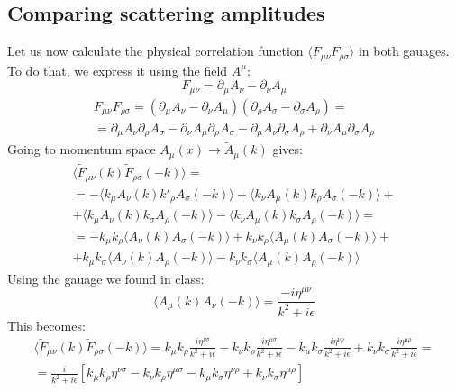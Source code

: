 \documentclass{article}
\begin{document}
\subsection{Comparing scattering amplitudes}
Let us now calculate the physical correlation function $\langle F_{\mu\nu} F_{\rho\sigma} \rangle$ in both gauages. To do that, we express it using the field $A^{\mu}$:
\begin{equation}
    F_{\mu\nu} = \partial_\mu A_\nu - \partial_\nu A_\mu
\end{equation}
\begin{equation}
\begin{gathered}
    F_{\mu\nu} F_{\rho\sigma} =
    \left(\partial_\mu A_\nu - \partial_\nu A_\mu\right)
    \left(\partial_\rho A_\sigma - \partial_\sigma A_\rho\right) = \\ =
    \partial_\mu A_\nu \partial_\rho A_\sigma - \partial_\nu A_\mu \partial_\rho A_\sigma -
    \partial_\mu A_\nu \partial_\sigma A_\rho + \partial_\nu A_\mu \partial_\sigma A_\rho
\end{gathered}
\end{equation}
Going to momentum space $A_\mu(x) \rightarrow \tilde{A}_\mu(k)$ gives:
\begin{equation}
\begin{gathered}
    \langle \tilde{F}_{\mu\nu}(k) \tilde{F}_{\rho\sigma}(-k) \rangle = \\ =
    -\langle k_\mu A_\nu(k) k'_\rho A_\sigma(-k) \rangle + \langle k_\nu A_\mu(k) k_\rho A_\sigma(-k) \rangle + \\ +
    \langle k_\mu A_\nu(k) k_\sigma A_\rho(-k) \rangle - \langle k_\nu A_\mu(k) k_\sigma A_\rho(-k) \rangle = \\ =
    - k_\mu k_\rho \langle A_\nu(k) A_\sigma(-k) \rangle + k_\nu k_\rho \langle A_\mu(k) A_\sigma(-k) \rangle + \\ +
    k_\mu k_\sigma \langle A_\nu(k) A_\rho(-k) \rangle - k_\nu k_\sigma \langle A_\mu(k) A_\rho(-k) \rangle
\end{gathered}
\end{equation}
Using the gauage we found in class:
\begin{equation}
    \langle A_\mu(k) A_\nu (-k) \rangle = \frac{- i \eta^{\mu\nu}}{k^2 + i\epsilon}
\end{equation}
This becomes:
\begin{equation}
\begin{gathered}
    \langle \tilde{F}_{\mu\nu}(k) \tilde{F}_{\rho\sigma}(-k) \rangle =
    k_\mu k_\rho \frac{i \eta^{\nu\sigma}}{k^2 + i\epsilon} - k_\nu k_\rho  \frac{i \eta^{\mu\sigma}}{k^2 + i\epsilon} -
    k_\mu k_\sigma \frac{i \eta^{\nu\rho}}{k^2 + i\epsilon} + k_\nu k_\sigma  \frac{i \eta^{\mu\rho}}{k^2 + i\epsilon} = \\ =
    \frac{i}{k^2 + i\epsilon} \left[
        k_\mu k_\rho \eta^{\nu\sigma} - 
        k_\nu k_\rho \eta^{\mu\sigma} - 
        k_\mu k_\sigma \eta^{\nu\rho} + 
        k_\nu k_\sigma \eta^{\mu\rho}
    \right]
\end{gathered}
\end{equation}
\end{document}

